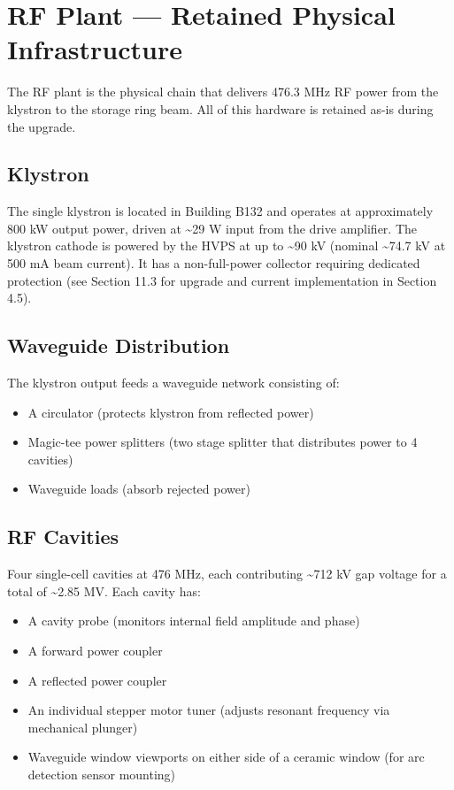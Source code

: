 {\section{RF Plant --- Retained Physical Infrastructure}\label{rf-plant-retained-physical-infrastructure}

The RF plant is the physical chain that delivers 476.3 MHz RF power from the klystron to the storage ring beam. All of this hardware is retained as-is during the upgrade.

\subsection{Klystron}\label{klystron}

The single klystron is located in Building B132 and operates at approximately 800 kW output power, driven at \textasciitilde29 W input from the drive amplifier. The klystron cathode is powered by the HVPS at up to \textasciitilde90 kV (nominal \textasciitilde74.7 kV at 500 mA beam current). It has a non-full-power collector requiring dedicated protection (see Section 11.3 for upgrade and current implementation in Section 4.5).

\subsection{Waveguide Distribution}\label{waveguide-distribution}

The klystron output feeds a waveguide network consisting of:

\begin{itemize}
\tightlist
\item
  A circulator (protects klystron from reflected power)
\item
  Magic-tee power splitters (two stage splitter that distributes power to 4 cavities)
\item
  Waveguide loads (absorb rejected power)
\end{itemize}

\subsection{RF Cavities}\label{rf-cavities}

Four single-cell cavities at 476 MHz, each contributing \textasciitilde712 kV gap voltage for a total of \textasciitilde2.85 MV. Each cavity has:

\begin{itemize}
\tightlist
\item
  A cavity probe (monitors internal field amplitude and phase)
\item
  A forward power coupler
\item
  A reflected power coupler
\item
  An individual stepper motor tuner (adjusts resonant frequency via mechanical plunger)
\item
  Waveguide window viewports on either side of a ceramic window (for arc detection sensor mounting)
\end{itemize}

}
